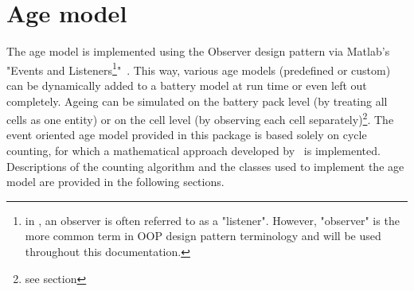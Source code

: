 \section{Age model}
The age model is implemented using the Observer design pattern via Matlab's "Events and Listeners\footnote{in \matlab, an observer is often referred to as a "listener". However, "observer" is the more common term in OOP design pattern terminology and will be used throughout this documentation.}"~\cite{_overview_????}. This way, various age models (predefined or custom) can be dynamically added to a battery model at run time or even left out completely. Ageing can be simulated on the battery pack level (by treating all cells as one entity) or on the cell level (by observing each cell separately)\footnote{see section}. The event oriented age model provided in this package is based solely on cycle counting, for which a mathematical approach developed by~\cite{dambrowski_mathematical_2012} is implemented. Descriptions of the counting algorithm and the classes used to implement the age model are provided in the following sections.
